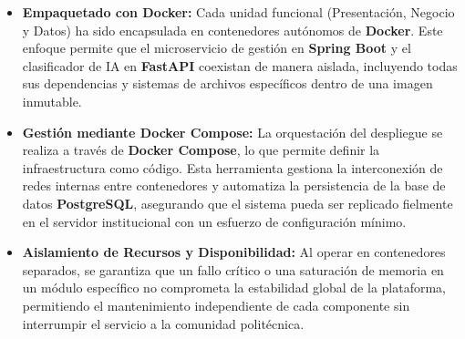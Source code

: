 \begin{itemize}
    \item \textbf{Empaquetado con Docker:} Cada unidad funcional (Presentación, Negocio y Datos) ha sido encapsulada en contenedores autónomos de \textbf{Docker}. Este enfoque permite que el microservicio de gestión en \textbf{Spring Boot} y el clasificador de IA en \textbf{FastAPI} coexistan de manera aislada, incluyendo todas sus dependencias y sistemas de archivos específicos dentro de una imagen inmutable.
    \item \textbf{Gestión mediante Docker Compose:} La orquestación del despliegue se realiza a través de \textbf{Docker Compose}, lo que permite definir la infraestructura como código. Esta herramienta gestiona la interconexión de redes internas entre contenedores y automatiza la persistencia de la base de datos \textbf{PostgreSQL}, asegurando que el sistema pueda ser replicado fielmente en el servidor institucional con un esfuerzo de configuración mínimo.
    \item \textbf{Aislamiento de Recursos y Disponibilidad:} Al operar en contenedores separados, se garantiza que un fallo crítico o una saturación de memoria en un módulo específico no comprometa la estabilidad global de la plataforma, permitiendo el mantenimiento independiente de cada componente sin interrumpir el servicio a la comunidad politécnica.
\end{itemize}